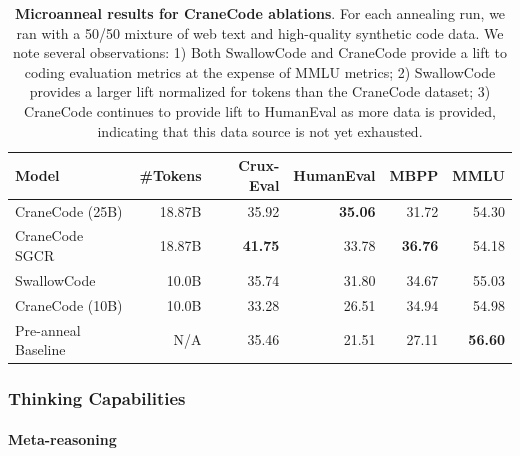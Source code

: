\documentclass[table]{ai2style/ai2}
\begin{document}
{{\begin{table}[h]
\centering
\begin{tabular}{lrrrrr}
\hline
{\bf Model} & {\bf \#Tokens} & {\bf Crux-Eval} & {\bf HumanEval} & {\bf MBPP} & {\bf MMLU} \\
\hline
\rowcolor{ai2offwhite} CraneCode (25B) & 18.87B & 35.92 & \textbf{35.06} & 31.72 & 54.30 \\
CraneCode SGCR & 18.87B & \textbf{41.75} & 33.78 & \textbf{36.76} & 54.18 \\
\rowcolor{ai2offwhite} SwallowCode & 10.0B & 35.74 & 31.80 & 34.67 & 55.03 \\
CraneCode (10B) & 10.0B & 33.28 & 26.51 & 34.94 & 54.98 \\
\rowcolor{ai2offwhite} Pre-anneal Baseline & N/A & 35.46 & 21.51 & 27.11 & \textbf{56.60} \\
\hline
\end{tabular}
\caption{\textbf{Microanneal results for CraneCode ablations}. For each annealing run, we ran with a 50/50 mixture of web text and high-quality synthetic code data. We note several observations: 1) Both SwallowCode and CraneCode provide a lift to coding evaluation metrics at the expense of MMLU metrics; 2) SwallowCode provides a larger lift normalized for tokens than the CraneCode dataset; 3) CraneCode continues to provide lift to HumanEval as more data is provided, indicating that this data source is not yet exhausted.}
\label{tab:microanneal_code}
\end{table}

\subsubsection{Thinking Capabilities}

\paragraph{Meta-reasoning}

}}
\end{document}

